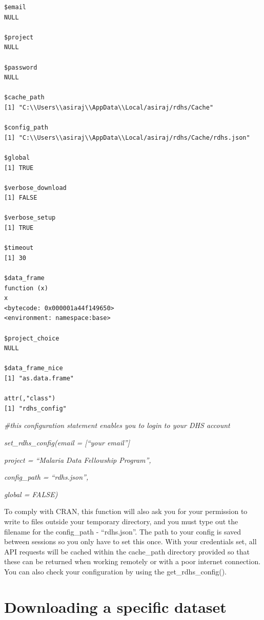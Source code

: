 \documentclass[
  letterpaper,
  DIV=11,
  numbers=noendperiod]{scrreprt}
\begin{document}
\begin{verbatim}
$email
NULL

$project
NULL

$password
NULL

$cache_path
[1] "C:\\Users\\asiraj\\AppData\\Local/asiraj/rdhs/Cache"

$config_path
[1] "C:\\Users\\asiraj\\AppData\\Local/asiraj/rdhs/Cache/rdhs.json"

$global
[1] TRUE

$verbose_download
[1] FALSE

$verbose_setup
[1] TRUE

$timeout
[1] 30

$data_frame
function (x) 
x
<bytecode: 0x000001a44f149650>
<environment: namespace:base>

$project_choice
NULL

$data_frame_nice
[1] "as.data.frame"

attr(,"class")
[1] "rdhs_config"
\end{verbatim}

\emph{\#this configuration statement enables you to login to your DHS
account}

\emph{set\_rdhs\_config(email = {[}``your email''{]}}

\emph{project = ``Malaria Data Fellowship Program'',}

\emph{config\_path = ``rdhs.json'',}

\emph{global = FALSE)}

To comply with CRAN, this function will also ask you for your permission
to write to files outside your temporary directory, and you must type
out the filename for the config\_path - ``rdhs.json''. The path to your
config is saved between sessions so you only have to set this once. With
your credentials set, all API requests will be cached within the
cache\_path directory provided so that these can be returned when
working remotely or with a poor internet connection. You can also check
your configuration by using the get\_rdhs\_config().

\section{Downloading a specific
dataset}\label{downloading-a-specific-dataset}
\end{document}
